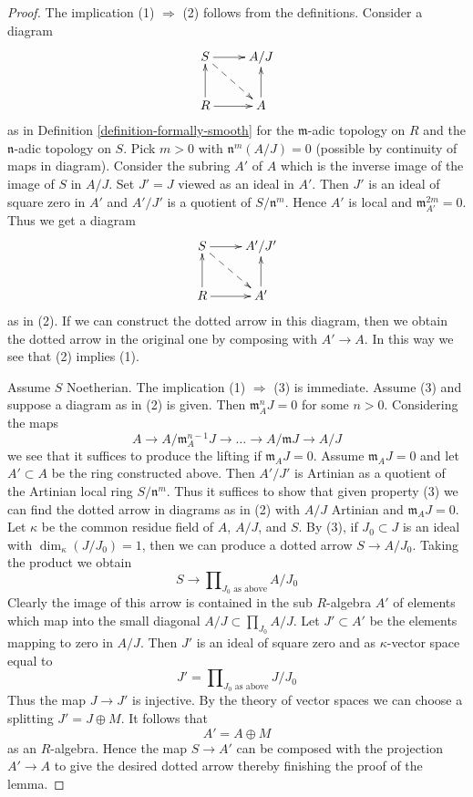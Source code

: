 \documentclass{amsart}
\theoremstyle{plain}
\theoremstyle{definition}
\theoremstyle{remark}
\numberwithin{equation}{subsection}
\begin{document}
\begin{proof}
The implication (1) $\Rightarrow$ (2) follows from the definitions.
Consider a diagram
$$
\xymatrix{
S \ar[r] \ar@{-->}[rd] & A/J \\
R \ar[r] \ar[u] & A \ar[u]
}
$$
as in Definition \ref{definition-formally-smooth} for the
$\mathfrak m$-adic topology on $R$ and the $\mathfrak n$-adic topology on $S$.
Pick $m > 0$ with $\mathfrak n^m(A/J) = 0$
(possible by continuity of maps in diagram).
Consider the subring $A'$ of $A$ which is the inverse image
of the image of $S$ in $A/J$. Set $J' = J$ viewed as an ideal in $A'$.
Then $J'$ is an ideal of square zero in $A'$ and $A'/J'$
is a quotient of $S/\mathfrak n^m$. Hence $A'$ is local
and $\mathfrak m_{A'}^{2m} = 0$. Thus we get a diagram
$$
\xymatrix{
S \ar[r] \ar@{-->}[rd] & A'/J' \\
R \ar[r] \ar[u] & A' \ar[u]
}
$$
as in (2). If we can construct the dotted arrow in this diagram,
then we obtain the dotted arrow in the original one by composing
with $A' \to A$. In this way we see that (2) implies (1).

\medskip\noindent
Assume $S$ Noetherian. The implication (1) $\Rightarrow$ (3) is immediate.
Assume (3) and suppose a diagram as in (2) is given.
Then $\mathfrak m_A^n J = 0$ for some $n > 0$.
Considering the maps
$$
A \to A/\mathfrak m_A^{n - 1}J \to \ldots \to A/\mathfrak mJ \to A/J
$$
we see that it suffices to produce the lifting if $\mathfrak m_A J = 0$.
Assume $\mathfrak m_A J = 0$ and let $A' \subset A$ be the ring
constructed above. Then $A'/J'$ is Artinian
as a quotient of the Artinian local ring $S/\mathfrak n^m$.
Thus it suffices to show that given property (3) we can find the dotted
arrow in diagrams as in (2) with $A/J$ Artinian and
$\mathfrak m_A J = 0$.
Let $\kappa$ be the common residue field of $A$,
$A/J$, and $S$. By (3), if $J_0 \subset J$ is an ideal with
$\dim_\kappa(J/J_0) = 1$, then we can produce a dotted arrow
$S \to A/J_0$. Taking the product we obtain
$$
S \longrightarrow \prod\nolimits_{J_0 \text{ as above}} A/J_0
$$
Clearly the image of this arrow is contained in the sub $R$-algebra
$A'$ of elements which map into the small diagonal
$A/J \subset \prod_{J_0} A/J$.
Let $J' \subset A'$ be the elements mapping to zero in $A/J$.
Then $J'$ is an ideal of square zero and as $\kappa$-vector space
equal to
$$
J' = \prod\nolimits_{J_0 \text{ as above}} J/J_0
$$
Thus the map $J \to J'$ is injective. By the theory of vector spaces
we can choose a splitting $J' = J \oplus M$. It follows that
$$
A' = A \oplus M
$$
as an $R$-algebra. Hence the map $S \to A'$ can be composed with
the projection $A' \to A$ to give the desired dotted arrow thereby
finishing the proof of the lemma.
\end{proof}
\end{document}
